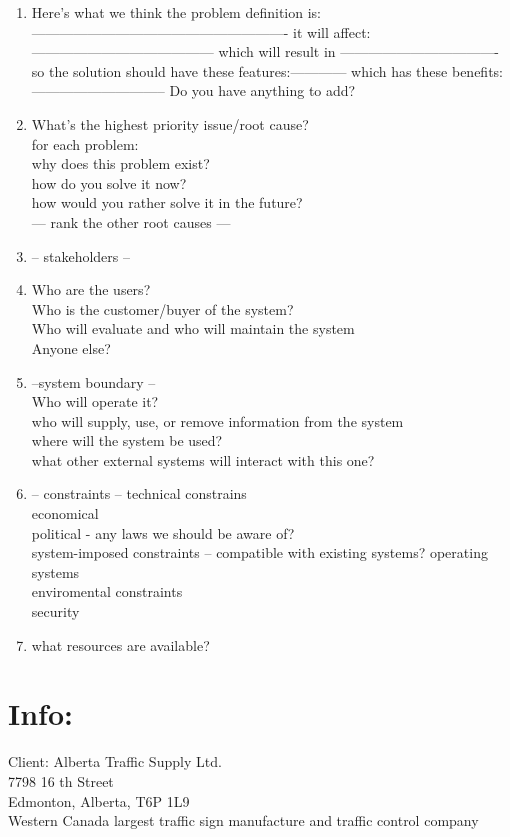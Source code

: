 \documentclass[letterpaper]{article}
\begin{document}
\begin{enumerate}
       
 \item Here's what we think the problem definition is:
       -------------------------------------------------------
       it will affect: ---------------------------------------
       which will result in ----------------------------------
       so the solution should have these features:------------
       which has these benefits: -----------------------------
       Do you have anything to add?
 \item What's the highest priority issue/root cause? \\
       for each problem: \\
       why does this problem exist?\\
       how do you solve it now?\\
       how would you rather solve it in the future?\\
       --- rank the other root causes ---
 \item -- stakeholders --
 \item Who are the users?\\
       Who is the customer/buyer of the system?\\
       Who will evaluate and who will maintain the system\\
       Anyone else?
 \item --system boundary --\\
       Who will operate it?\\
       who will supply, use, or remove information from the system\\
       where will the system be used?\\
       what other external systems will interact with this one?\\
 \item -- constraints --
       technical constrains\\
       economical\\
       political - any laws we should be aware of?\\
       system-imposed constraints -- compatible with existing systems? operating systems\\
       enviromental constraints\\
       security\\
 \item what resources are available?
\end{enumerate}

\section{Info:}
Client:
Alberta Traffic Supply Ltd.\\
7798 16 th Street\\
Edmonton, Alberta, T6P 1L9\\
Western Canada largest traffic sign manufacture and traffic control company\\
\end{document}

